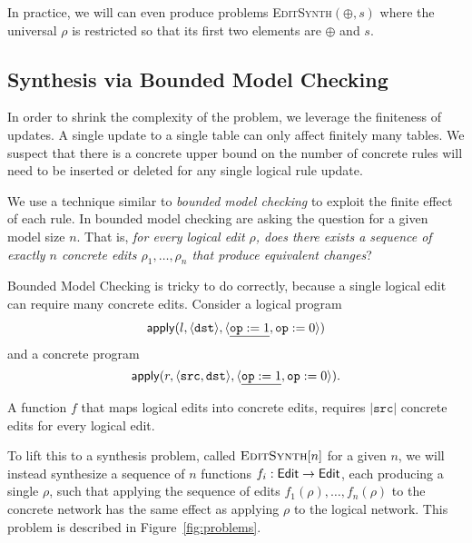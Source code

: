 In practice, we will can even produce problems \textsc{EditSynth}$(\oplus,s)$
where the universal $\rho$ is restricted so that its first two elements are
$\oplus$ and $s$.



\subsection{Synthesis via Bounded Model Checking}


In order to shrink the complexity of the problem, we leverage the finiteness of
updates. A single update to a single table can only affect finitely many
tables. We suspect that there is a concrete upper bound on the number of
concrete rules will need to be inserted or deleted for any single logical rule
update. 

We use a technique similar to \emph{bounded model checking} to exploit the
finite effect of each rule. In bounded model checking are asking the question
for a given model size $n$. That is, \emph{for every logical edit $\rho$, does
  there exists a sequence of exactly $n$ concrete edits $\rho_1, \ldots, \rho_n$
  that produce equivalent changes}?

\begin{example}
  Bounded Model Checking is tricky to do correctly, because a single
  logical edit can require many concrete edits. Consider a logical program
  \[\begin{array}{l}
      \mathsf{apply}(l, \langle  \texttt{dst} \rangle, \langle \underline{\texttt{op} := 1}, \texttt{op} := 0 \rangle)
    \end{array}
  \]
  and a concrete program
  \[\mathsf{apply}(r, \langle \texttt{src}, \texttt{dst} \rangle, \langle \underline{\texttt{op} := 1}, \texttt{op} := 0 \rangle).\]
  
  A function $f$ that maps logical edits into concrete edits, requires
  $|\texttt{src}|$ concrete edits for every logical edit.
\end{example}

To lift this to a synthesis problem, called $\textsc{EditSynth}[n]$ for a given
$n$, we will instead synthesize a sequence of $n$ functions
$f_i : \mathsf{Edit} \to \mathsf{Edit}$, each producing a single $\rho$, such that applying the
sequence of edits $f_1(\rho), \ldots, f_n(\rho)$ to the concrete network has the
same effect as applying $\rho$ to the logical network. This problem is described
in Figure~\ref{fig:problems}.

